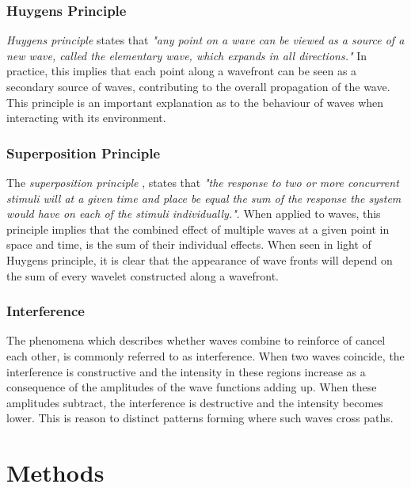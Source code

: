 \documentclass[10pt, nofootinbib, twocolumn]{revtex4-1}
\begin{document}
\subsubsection{Huygens Principle}
\textit{Huygens principle} \cite{oscillations} states that \textit{"any point on a wave can be viewed as a source of a new wave, called the elementary wave, which expands in all directions."} In practice, this implies that each point along a wavefront can be seen as a secondary source of waves, contributing to the overall propagation of the wave. This principle is an important explanation as to the behaviour of waves when interacting with its environment. 

\subsubsection{Superposition Principle}
The \textit{superposition principle} \cite{oscillations}, states that \textit{"the response to two or more concurrent stimuli will at a given time and place be equal the sum of the response the system would have on each of the stimuli individually."}. When applied to waves, this principle implies that the combined effect of multiple waves at a given point in space and time, is the sum of their individual effects. When seen in light of Huygens principle, it is clear that the appearance of wave fronts will depend on the sum of every wavelet constructed along a wavefront. 

\newpage
\subsubsection{Interference}
The phenomena which describes whether waves combine to reinforce of cancel each other, is commonly referred to as interference. When two waves coincide, the interference is constructive and the intensity in these regions increase as a consequence of the amplitudes of the wave functions adding up. When these amplitudes subtract, the interference is destructive and the intensity becomes lower. This is reason to distinct patterns forming where such waves cross paths. 



\section{Methods}\label{sec:methods} 
\end{document}
